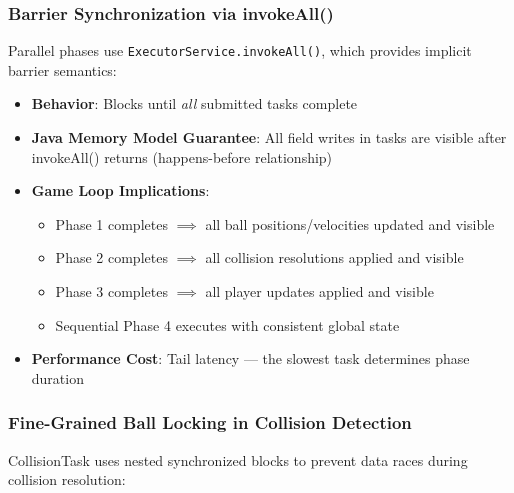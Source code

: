 \documentclass[12pt,a4paper]{article}
\begin{document}
\subsubsection{Barrier Synchronization via invokeAll()}
 
Parallel phases use \texttt{ExecutorService.invokeAll()}, which provides implicit barrier semantics:
 
\begin{itemize}
    \item \textbf{Behavior}: Blocks until \textit{all} submitted tasks complete
    \item \textbf{Java Memory Model Guarantee}: All field writes in tasks are visible after invokeAll() returns (happens-before relationship)
    \item \textbf{Game Loop Implications}:
    \begin{itemize}
        \item Phase 1 completes $\implies$ all ball positions/velocities updated and visible
        \item Phase 2 completes $\implies$ all collision resolutions applied and visible
        \item Phase 3 completes $\implies$ all player updates applied and visible
        \item Sequential Phase 4 executes with consistent global state
    \end{itemize}
    \item \textbf{Performance Cost}: Tail latency --- the slowest task determines phase duration
\end{itemize}
 
\subsubsection{Fine-Grained Ball Locking in Collision Detection}
 
CollisionTask uses nested synchronized blocks to prevent data races during collision resolution:
 
\end{document}

